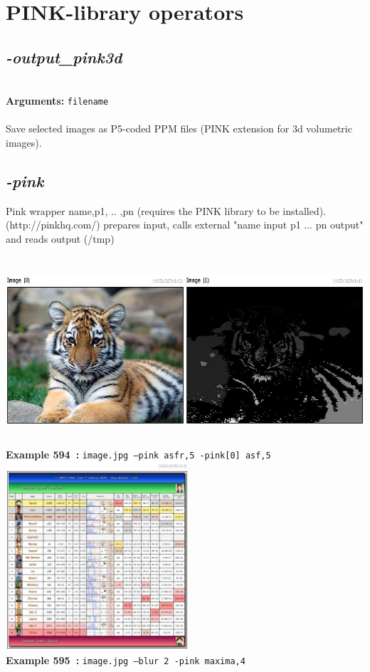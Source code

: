 \documentclass[a4paper,11pt,twoside]{book}
\begin{document}
\section{PINK-library operators}


\subsection{\emph{-output\_pink3d} }\vspace*{-0.5em}
~\\\textbf{Arguments: } 
{\small \texttt{filename}}\\~\\
Save selected images as P5-coded PPM files (PINK extension for 3d volumetric images).


\subsection{\emph{-pink} }\vspace*{-0.5em}
Pink wrapper name,p1, .. ,pn (requires the PINK library to be installed).
~\\(http://pinkhq.com/)
prepares input, calls external "name input p1 ... pn output" and reads output (/tmp)
\begin{center}\includegraphics[keepaspectratio=true,height=7cm,width=\textwidth]{img/gmic_def594.jpg}\\
{\footnotesize \textbf{Example 594~:} \texttt{image.jpg --pink asfr,5 -pink[0] asf,5}}
\\\includegraphics[keepaspectratio=true,height=7cm,width=\textwidth]{img/gmic_def595.jpg}\\
{\footnotesize \textbf{Example 595~:} \texttt{image.jpg --blur 2 -pink maxima,4}}
\end{center}
\end{document}
